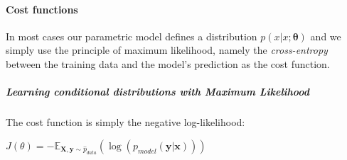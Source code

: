 \paragraph{Cost functions}
In most cases our parametric model defines a distribution $p(x\lvert x;\bm{\theta})$ and
we simply use the principle of maximum likelihood, namely the \textit{cross-entropy} 
between the training data and the model's prediction as the cost function.

\subparagraph{Learning conditional distributions with Maximum Likelihood}
The cost function is simply the negative log-likelihood:
\begin{center}
	$J(\theta) = -\mathbb{E}_{\bm{X},\bm{y}\sim\hat{p}_{data}}\left(
	\log\left(p_{model}(\bm{y}|\bm{x})\right)\right)$
\end{center}

